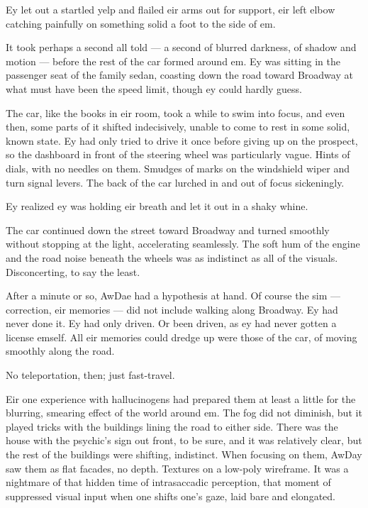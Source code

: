 Ey let out a startled yelp and flailed eir arms out for support, eir left elbow catching painfully on something solid a foot to the side of em.

It took perhaps a second all told --- a second of blurred darkness, of shadow and motion --- before the rest of the car formed around em. Ey was sitting in the passenger seat of the family sedan, coasting down the road toward Broadway at what must have been the speed limit, though ey could hardly guess.

The car, like the books in eir room, took a while to swim into focus, and even then, some parts of it shifted indecisively, unable to come to rest in some solid, known state. Ey had only tried to drive it once before giving up on the prospect, so the dashboard in front of the steering wheel was particularly vague. Hints of dials, with no needles on them. Smudges of marks on the windshield wiper and turn signal levers. The back of the car lurched in and out of focus sickeningly.

Ey realized ey was holding eir breath and let it out in a shaky whine.

The car continued down the street toward Broadway and turned smoothly without stopping at the light, accelerating seamlessly. The soft hum of the engine and the road noise beneath the wheels was as indistinct as all of the visuals. Disconcerting, to say the least.

After a minute or so, AwDae had a hypothesis at hand. Of course the sim --- correction, eir memories --- did not include walking along Broadway. Ey had never done it. Ey had only driven. Or been driven, as ey had never gotten a license emself. All eir memories could dredge up were those of the car, of moving smoothly along the road.

No teleportation, then; just fast-travel.

Eir one experience with hallucinogens had prepared them at least a little for the blurring, smearing effect of the world around em. The fog did not diminish, but it played tricks with the buildings lining the road to either side. There was the house with the psychic's sign out front, to be sure, and it was relatively clear, but the rest of the buildings were shifting, indistinct. When focusing on them, AwDay saw them as flat facades, no depth. Textures on a low-poly wireframe. It was a nightmare of that hidden time of intrasaccadic perception, that moment of suppressed visual input when one shifts one's gaze, laid bare and elongated.

